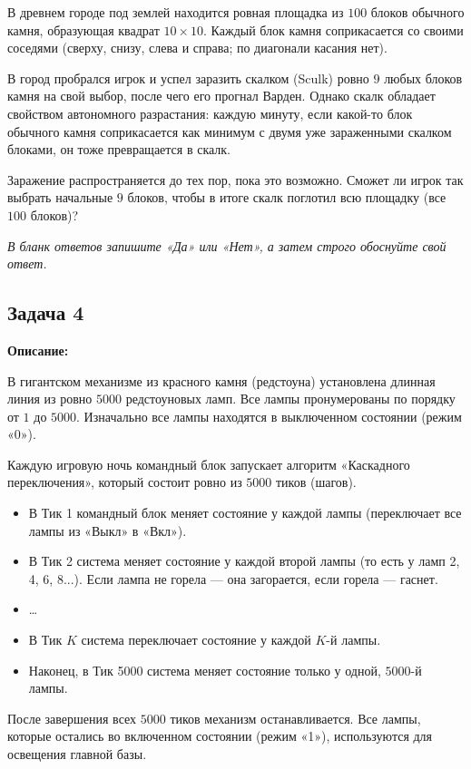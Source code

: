 \documentclass[12pt,a4paper]{article}
\begin{document}
В древнем городе под землей находится ровная площадка из $100$ блоков обычного камня, образующая квадрат $10 \times 10$. 
Каждый блок камня соприкасается со своими соседями (сверху, снизу, слева и справа; по диагонали касания нет).

В город пробрался игрок и успел заразить скалком (Sculk) ровно $9$ любых блоков камня на свой выбор, после чего его прогнал Варден. 
Однако скалк обладает свойством автономного разрастания: каждую минуту, если какой-то блок обычного камня соприкасается как минимум с двумя уже зараженными скалком блоками, он тоже превращается в скалк. 

Заражение распространяется до тех пор, пока это возможно. 
Сможет ли игрок так выбрать начальные $9$ блоков, чтобы в итоге скалк поглотил всю площадку (все $100$ блоков)?

\textit{В бланк ответов запишите «Да» или «Нет», а затем строго обоснуйте свой ответ.}

\newpage
\subsection*{Задача 4}

\textbf{Описание:}

В гигантском механизме из красного камня (редстоуна) установлена длинная линия из ровно $5000$ редстоуновых ламп. Все лампы пронумерованы по порядку от $1$ до $5000$.
Изначально все лампы находятся в выключенном состоянии (режим «0»).

Каждую игровую ночь командный блок запускает алгоритм «Каскадного переключения», который состоит ровно из $5000$ тиков (шагов).
\begin{itemize}
    \item В Тик 1 командный блок меняет состояние у каждой лампы (переключает все лампы из «Выкл» в «Вкл»).
    \item В Тик 2 система меняет состояние у каждой второй лампы (то есть у ламп 2, 4, 6, 8...). Если лампа не горела — она загорается, если горела — гаснет.
    \item \dots
    \item В Тик $K$ система переключает состояние у каждой $K$-й лампы.
    \item Наконец, в Тик 5000 система меняет состояние только у одной, $5000$-й лампы.
\end{itemize}

После завершения всех $5000$ тиков механизм останавливается. Все лампы, которые остались во включенном состоянии (режим «1»), используются для освещения главной базы.
\end{document}
